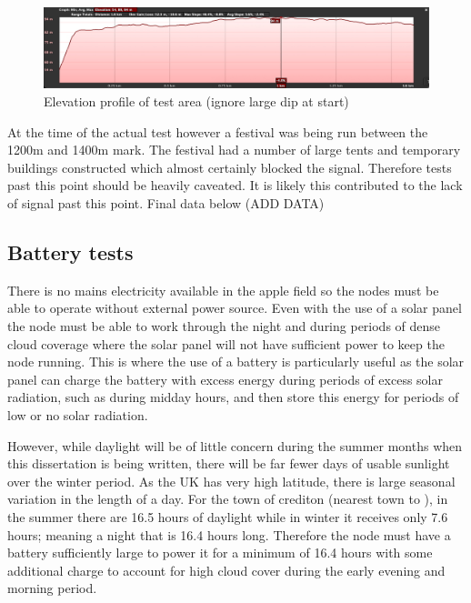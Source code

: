 \begin{figure}[H]
    \centering
    \includegraphics[width=1\textwidth]{contents/23-hw-development/23-fig/range-test-elevation-profile.jpg}
    \caption{Elevation profile of test area (ignore large dip at start)}
    \label{fig:range-test-elevation}
\end{figure}

At the time of the actual test however a festival was being run between the
1200m and 1400m mark. The festival had a number of large tents and temporary
buildings constructed which almost certainly blocked the signal. Therefore tests
past this point should be heavily caveated. It is likely this contributed to the
lack of signal past this point. Final data below (ADD DATA)

\subsection{Battery tests}

There is no mains electricity available in the apple field so the nodes must be
able to operate without external power source. Even with the use of a solar
panel the node must be able to work through the night and during periods of
dense cloud coverage where the solar panel will not have sufficient power to
keep the node running. This is where the use of a battery is particularly useful
as the solar panel can charge the battery with excess energy during periods of
excess solar radiation, such as during midday hours, and then store this energy
for periods of low or no solar radiation.

However, while daylight will be of little concern during the summer months when
this dissertation is being written, there will be far fewer days of usable
sunlight over the winter period. As the UK has very high latitude, there is
large seasonal variation in the length of a day. For the town of crediton
(nearest town to \farmName), in the summer there are 16.5 hours of daylight
while in winter it receives only 7.6 hours; meaning a night that is 16.4 hours
long. Therefore the node must have a battery sufficiently large to power it for
a minimum of 16.4 hours with some additional charge to account for high cloud
cover during the early evening and morning period.

